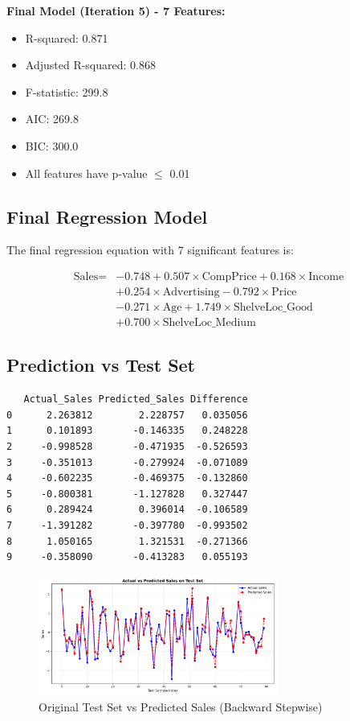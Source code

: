 \documentclass[12pt]{article}
\begin{document}
\textbf{Final Model (Iteration 5) - 7 Features:}
\begin{itemize}
    \item R-squared: 0.871
    \item Adjusted R-squared: 0.868
    \item F-statistic: 299.8
    \item AIC: 269.8
    \item BIC: 300.0
    \item All features have p-value $\leq$ 0.01
\end{itemize}

\subsection{Final Regression Model}

The final regression equation with 7 significant features is:

\begin{equation}
\begin{aligned}
\text{Sales} = &-0.748 + 0.507 \times \text{CompPrice} + 0.168 \times \text{Income} \\
&+ 0.254 \times \text{Advertising} - 0.792 \times \text{Price} \\
&- 0.271 \times \text{Age} + 1.749 \times \text{ShelveLoc\_Good} \\
&+ 0.700 \times \text{ShelveLoc\_Medium}
\end{aligned}
\end{equation}

\subsection{Prediction vs Test Set}


\begin{verbatim}
   Actual_Sales Predicted_Sales Difference
0      2.263812        2.228757   0.035056
1      0.101893       -0.146335   0.248228
2     -0.998528       -0.471935  -0.526593
3     -0.351013       -0.279924  -0.071089
4     -0.602235       -0.469375  -0.132860
5     -0.800381       -1.127828   0.327447
6      0.289424        0.396014  -0.106589
7     -1.391282       -0.397780  -0.993502
8      1.050165        1.321531  -0.271366
9     -0.358090       -0.413283   0.055193
\end{verbatim}


\begin{figure}[H]
    \centering
    \includegraphics[width=0.7\textwidth]{images/model_performance.png}
    \caption{Original Test Set vs Predicted Sales (Backward Stepwise)}
    \label{fig:stepwise_prediction}
\end{figure}
\end{document}
